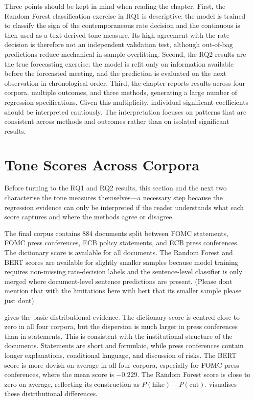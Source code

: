 Three points should be kept in mind when reading the chapter. First, the Random
Forest classification exercise in RQ1 is descriptive: the model is trained to
classify the sign of the contemporaneous rate decision and the continuous
\rfscore{} is then used as a text-derived tone measure. Its high agreement
with the rate decision is therefore not an independent validation test,
although out-of-bag predictions reduce mechanical in-sample overfitting.
Second, the RQ2 results are the true forecasting exercise: the model is refit
only on information available before the forecasted meeting, and the
prediction is evaluated on the next observation in chronological order.
Third, the chapter reports results across four corpora, multiple outcomes, and
three methods, generating a large number of regression specifications. Given
this multiplicity, individual significant coefficients should be interpreted
cautiously. The interpretation focuses on patterns that are consistent across
methods and outcomes rather than on isolated significant results.

\section{Tone Scores Across Corpora}
\label{sec:res_scores}

Before turning to the RQ1 and RQ2 results, this section and the next two
characterise the tone measures themselves---a necessary step because the
regression evidence can only be interpreted if the reader understands what
each score captures and where the methods agree or disagree.

The final corpus contains 884 documents split between FOMC statements, FOMC
press conferences, ECB policy statements, and ECB press conferences. The
dictionary score is available for all documents. The Random Forest and
BERT scores are available for slightly smaller samples because model
training requires non-missing rate-decision labels and the sentence-level
classifier is only merged where document-level sentence predictions are
present. (Please dont mention that with the limitations here with bert that its smaller sample please just dont)

 gives the basic distributional evidence. The
dictionary score is centred close to zero in all four corpora, but the
dispersion is much larger in press conferences than in statements. This is
consistent with the institutional structure of the documents. Statements are
short and formulaic, while press conferences contain longer explanations,
conditional language, and discussion of risks. The BERT score is more
dovish on average in all four corpora, especially for FOMC press conferences,
where the mean score is $-0.229$. The Random Forest score is close to zero on
average, reflecting its construction as $P(\text{hike}) - P(\text{cut})$.
 visualises these distributional differences.

